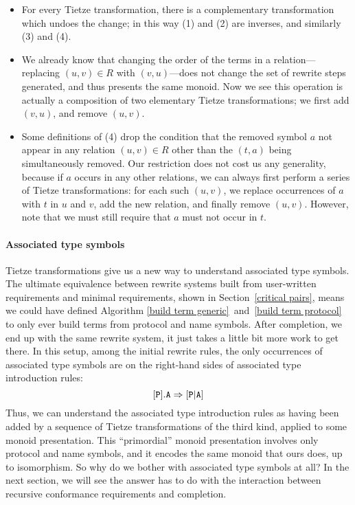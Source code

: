 \documentclass[../generics]{subfiles}
\begin{document}
\begin{itemize}
\item For every Tietze transformation, there is a complementary transformation which undoes the change; in this way (1) and (2) are inverses, and similarly (3) and (4).

\item We already know that changing the order of the terms in a relation---replacing $(u,v)\in R$ with $(v,u)$---does not change the set of rewrite steps generated, and thus presents the same monoid. Now we see this operation is actually a composition of two elementary Tietze transformations; we first add $(v,u)$, and remove $(u,v)$.

\item Some definitions of (4) drop the condition that the removed symbol $a$ not appear in any relation $(u,v)\in R$ other than the $(t,a)$ being simultaneously removed. Our restriction does not cost us any generality, because if $a$ occurs in any other relations, we can always first perform a series of Tietze transformations: for each such $(u,v)$, we replace occurrences of $a$ with $t$ in $u$ and $v$, add the new relation, and finally remove $(u,v)$. However, note that we must still require that $a$ must not occur in $t$.
\end{itemize}

\paragraph{Associated type symbols} Tietze transformations give us a new way to understand associated type symbols. The ultimate equivalence between rewrite systems built from user-written requirements and minimal requirements, shown in Section~\ref{critical pairs}, means we could have defined Algorithm \ref{build term generic}~and~\ref{build term protocol} to only ever build terms from protocol and name symbols. After completion, we end up with the same rewrite system, it just takes a little bit more work to get there. In this setup, among the initial rewrite rules, the only occurrences of associated type symbols are on the right-hand sides of associated type introduction rules:
\[[\texttt{P}].\texttt{A}\Rightarrow[\texttt{P}|\texttt{A}]\]
Thus, we can understand the associated type introduction rules as having been added by a sequence of Tietze transformations of the third kind, applied to some monoid presentation. This ``primordial'' monoid presentation involves only protocol and name symbols, and it encodes the same monoid that ours does, up to isomorphism. So why do we bother with associated type symbols at all? In the next section, we will see the answer has to do with the interaction between recursive conformance requirements and completion.
\end{document}
